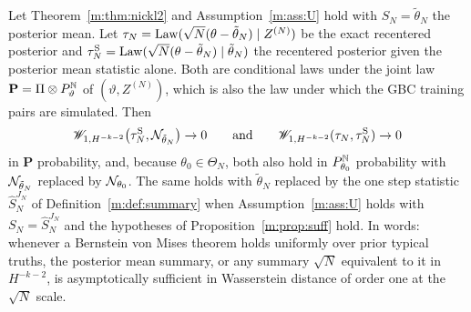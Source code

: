 \begin{theorem}\label{m:thm:jwbvm}
Let Theorem~\ref{m:thm:nickl2} and Assumption~\ref{m:ass:U} hold with $S_N=\tilde\theta_N$ the posterior mean. Let $\tau_N=\operatorname{Law}(\sqrt N(\theta-\tilde\theta_N)\mid Z^{(N)})$ be the exact recentered posterior and $\tau^{\rm S}_N=\operatorname{Law}(\sqrt N(\theta-\tilde\theta_N)\mid\tilde\theta_N)$ the recentered posterior given the posterior mean statistic alone. Both are conditional laws under the joint law $\mathbf{P}=\Pi\otimes P^{\mathbb{N}}_\vartheta$ of $(\vartheta,Z^{(N)})$, which is also the law under which the GBC training pairs are simulated. Then
\[
\mathscr{W}_{1,H^{-k-2}}\big(\tau^{\rm S}_N,\mathcal{N}_{\tilde\theta_N}\big)\to0\qquad\text{and}\qquad\mathscr{W}_{1,H^{-k-2}}(\tau_N,\tau^{\rm S}_N)\to0
\]
in $\mathbf{P}$ probability, and, because $\theta_0\in\Theta_N$, both also hold in $P^{\mathbb{N}}_{\theta_0}$ probability with $\mathcal{N}_{\tilde\theta_N}$ replaced by $\mathcal{N}_{\theta_0}$. The same holds with $\tilde\theta_N$ replaced by the one step statistic $\hat S^{J_N}_N$ of Definition~\ref{m:def:summary} when Assumption~\ref{m:ass:U} holds with $S_N=\hat S^{J_N}_N$ and the hypotheses of Proposition~\ref{m:prop:suff} hold. In words: whenever a Bernstein von Mises theorem holds uniformly over prior typical truths, the posterior mean summary, or any summary $\sqrt N$ equivalent to it in $H^{-k-2}$, is asymptotically sufficient in Wasserstein distance of order one at the $\sqrt N$ scale.
\end{theorem}

